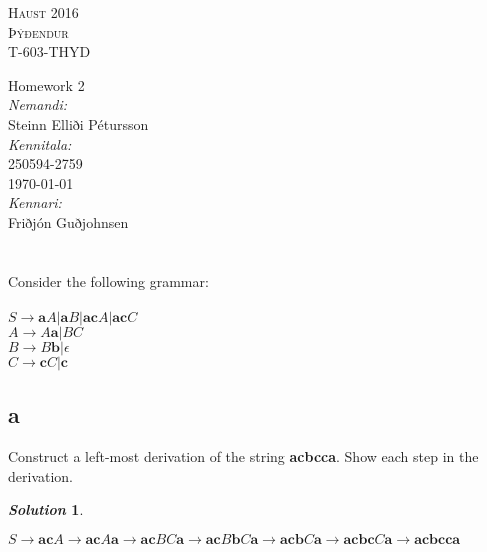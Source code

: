 \documentclass[11pt, a4paper]{article}
\newtheorem*{solution}{\emph{Solution}}
\begin{document}
\begin{titlepage}
\begin{center}

\textsc{\huge Haust 2016}\\[1.5cm]

\textsc{\huge Þýðendur}\\[0.2cm]
\textsc{\huge T-603-THYD}\\[1.5cm]

\end{center}
{ \huge Homework 2\\[1.5cm] }
\Large {
\emph{Nemandi:}\\
Steinn Elliði Pétursson\\[0.5cm]
\emph{Kennitala:}\\
250594-2759\\[0.5cm]
{\large \today}\\[0.5cm]
\emph{Kennari:} \\
Friðjón Guðjohnsen}\\

\end{titlepage}
\leavevmode

\section{}
	Consider the following grammar:\\~\\
		$S \rightarrow \textbf{a}A | \textbf{a}B | \textbf{ac}A | \textbf{ac}C$\\
		$A \rightarrow A\textbf{a} | BC$\\
		$B \rightarrow B\textbf{b} | \epsilon$\\
		$C \rightarrow \textbf{c}C | \textbf{c}$\\
	\subsection*{a} 
		Construct a left-most derivation of the string \textbf{acbcca}. Show each step in the derivation.
	\begin{solution}
	\end{solution}
		$S \rightarrow \textbf{ac}A \rightarrow \textbf{ac}A\textbf{a} \rightarrow \textbf{ac}BC\textbf{a}
		      \rightarrow \textbf{ac}B\textbf{b}C\textbf{a} \rightarrow \textbf{acb}C\textbf{a}
		      \rightarrow \textbf{acbc}C\textbf{a} \rightarrow \textbf{acbcca}$
\end{document}
